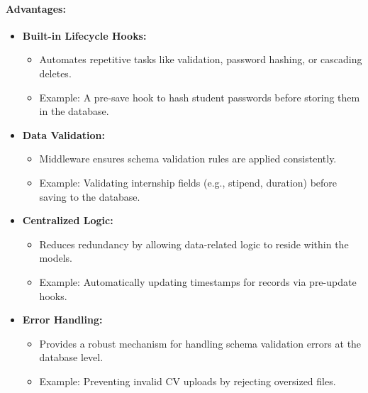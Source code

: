 \paragraph{Advantages:}
\begin{itemize}
    \item \textbf{Built-in Lifecycle Hooks:}
    \begin{itemize}
        \item Automates repetitive tasks like validation, password hashing, or cascading deletes.
        \item Example: A pre-save hook to hash student passwords before storing them in the database.
    \end{itemize}
    \item \textbf{Data Validation:}
    \begin{itemize}
        \item Middleware ensures schema validation rules are applied consistently.
        \item Example: Validating internship fields (e.g., stipend, duration) before saving to the database.
    \end{itemize}
    \item \textbf{Centralized Logic:}
    \begin{itemize}
        \item Reduces redundancy by allowing data-related logic to reside within the models.
        \item Example: Automatically updating timestamps for records via pre-update hooks.
    \end{itemize}
    \item \textbf{Error Handling:}
    \begin{itemize}
        \item Provides a robust mechanism for handling schema validation errors at the database level.
        \item Example: Preventing invalid CV uploads by rejecting oversized files.
    \end{itemize}
\end{itemize}

